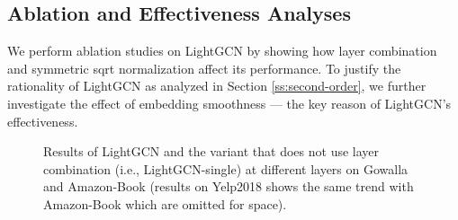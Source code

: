 \documentclass[sigconf]{acmart}
\theoremstyle{definition}
\begin{document}
\subsection{Ablation and Effectiveness Analyses}\label{ss:exp-ablation}
We perform ablation studies on LightGCN by showing how layer combination and symmetric sqrt normalization affect its performance. To justify the rationality of LightGCN as analyzed in Section \ref{ss:second-order}, we further investigate the effect of embedding smoothness --- the key reason of LightGCN's effectiveness. 




\begin{figure*}[t]
	\centering
	\vspace{-15pt}
	\caption{Results of LightGCN and the variant that does not use layer combination (i.e., LightGCN-single) at different layers on Gowalla and Amazon-Book (results on Yelp2018 shows the same trend with Amazon-Book which are omitted for space).} \vspace{-5pt}
	\label{fig:layer-combination}
\end{figure*}
\end{document}
